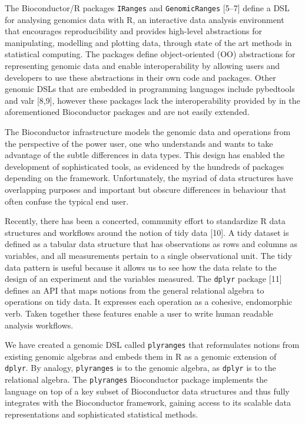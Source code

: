 \documentclass[10pt,letterpaper]{article}
\begin{document}
The Bioconductor/R packages \texttt{IRanges} and \texttt{GenomicRanges}
{[}5--7{]} define a DSL for analysing genomics data with R, an
interactive data analysis environment that encourages reproducibility
and provides high-level abstractions for manipulating, modelling and
plotting data, through state of the art methods in statistical
computing. The packages define object-oriented (OO) abstractions for
representing genomic data and enable interoperability by allowing users
and developers to use these abstractions in their own code and packages.
Other genomic DSLs that are embedded in programming languages include
pybedtools and valr {[}8,9{]}, however these packages lack the
interoperability provided by in the aforementioned Bioconductor packages
and are not easily extended.

The Bioconductor infrastructure models the genomic data and operations
from the perspective of the power user, one who understands and wants to
take advantage of the subtle differences in data types. This design has
enabled the development of sophisticated tools, as evidenced by the
hundreds of packages depending on the framework. Unfortunately, the
myriad of data structures have overlapping purposes and important but
obscure differences in behaviour that often confuse the typical end
user.

Recently, there has been a concerted, community effort to standardize R
data structures and workflows around the notion of tidy data {[}10{]}. A
tidy dataset is defined as a tabular data structure that has
observations as rows and columns as variables, and all measurements
pertain to a single observational unit. The tidy data pattern is useful
because it allows us to see how the data relate to the design of an
experiment and the variables measured. The \texttt{dplyr} package
{[}11{]} defines an API that maps notions from the general relational
algebra to operations on tidy data. It expresses each operation as a
cohesive, endomorphic verb. Taken together these features enable a user
to write human readable analysis workflows.

We have created a genomic DSL called \texttt{plyranges} that
reformulates notions from existing genomic algebras and embeds them in R
as a genomic extension of \texttt{dplyr}. By analogy, \texttt{plyranges}
is to the genomic algebra, as \texttt{dplyr} is to the relational
algebra. The \texttt{plyranges} Bioconductor package implements the
language on top of a key subset of Bioconductor data structures and thus
fully integrates with the Bioconductor framework, gaining access to its
scalable data representations and sophisticated statistical methods.
\end{document}
